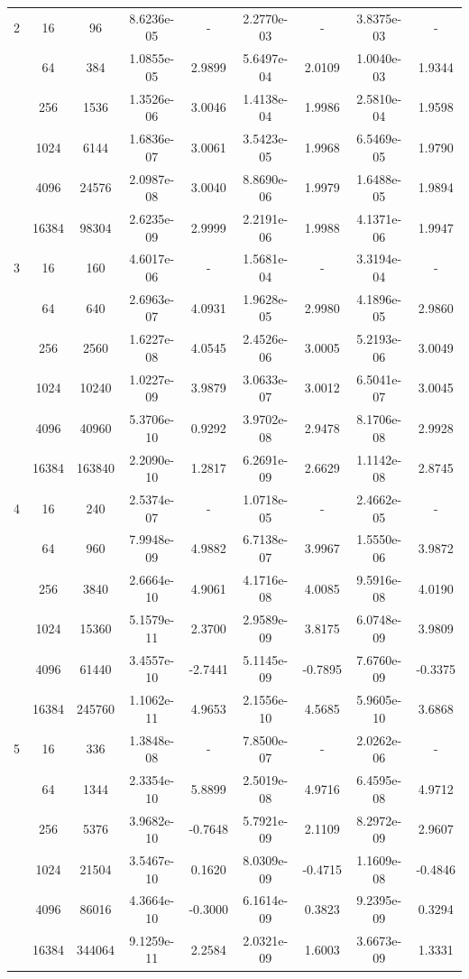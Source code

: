 \begin{longtable}{| c | c c | c c | c c | c c |}
	\hline

	2	& 16 & 96 & 8.6236e-05 & - & 2.2770e-03 & - & 3.8375e-03 & - \\
		& 64 & 384 & 1.0855e-05 & 2.9899 & 5.6497e-04 & 2.0109 & 1.0040e-03 & 1.9344 \\
		& 256 & 1536 & 1.3526e-06 & 3.0046 & 1.4138e-04 & 1.9986 & 2.5810e-04 & 1.9598 \\
		& 1024 & 6144 & 1.6836e-07 & 3.0061 & 3.5423e-05 & 1.9968 & 6.5469e-05 & 1.9790 \\
		& 4096 & 24576 & 2.0987e-08 & 3.0040 & 8.8690e-06 & 1.9979 & 1.6488e-05 & 1.9894 \\
		& 16384 & 98304 & 2.6235e-09 & 2.9999 & 2.2191e-06 & 1.9988 & 4.1371e-06 & 1.9947 \\

	\hline

	3	& 16 & 160 & 4.6017e-06 & - & 1.5681e-04 & - & 3.3194e-04 & - \\
		& 64 & 640 & 2.6963e-07 & 4.0931 & 1.9628e-05 & 2.9980 & 4.1896e-05 & 2.9860 \\
		& 256 & 2560 & 1.6227e-08 & 4.0545 & 2.4526e-06 & 3.0005 & 5.2193e-06 & 3.0049 \\
		& 1024 & 10240 & 1.0227e-09 & 3.9879 & 3.0633e-07 & 3.0012 & 6.5041e-07 & 3.0045 \\
		& 4096 & 40960 & 5.3706e-10 & 0.9292 & 3.9702e-08 & 2.9478 & 8.1706e-08 & 2.9928 \\
		& 16384 & 163840 & 2.2090e-10 & 1.2817 & 6.2691e-09 & 2.6629 & 1.1142e-08 & 2.8745 \\

	\hline

	4	& 16 & 240 & 2.5374e-07 & - & 1.0718e-05 & - & 2.4662e-05 & - \\
		& 64 & 960 & 7.9948e-09 & 4.9882 & 6.7138e-07 & 3.9967 & 1.5550e-06 & 3.9872 \\
		& 256 & 3840 & 2.6664e-10 & 4.9061 & 4.1716e-08 & 4.0085 & 9.5916e-08 & 4.0190 \\
		& 1024 & 15360 & 5.1579e-11 & 2.3700 & 2.9589e-09 & 3.8175 & 6.0748e-09 & 3.9809 \\
		& 4096 & 61440 & 3.4557e-10 & -2.7441 & 5.1145e-09 & -0.7895 & 7.6760e-09 & -0.3375 \\
		& 16384 & 245760 & 1.1062e-11 & 4.9653 & 2.1556e-10 & 4.5685 & 5.9605e-10 & 3.6868 \\

	\hline
    
	5	& 16 & 336 & 1.3848e-08 & - & 7.8500e-07 & - & 2.0262e-06 & - \\
		& 64 & 1344 & 2.3354e-10 & 5.8899 & 2.5019e-08 & 4.9716 & 6.4595e-08 & 4.9712 \\
		& 256 & 5376 & 3.9682e-10 & -0.7648 & 5.7921e-09 & 2.1109 & 8.2972e-09 & 2.9607 \\
		& 1024 & 21504 & 3.5467e-10 & 0.1620 & 8.0309e-09 & -0.4715 & 1.1609e-08 & -0.4846 \\	
		& 4096 & 86016 & 4.3664e-10 & -0.3000 & 6.1614e-09 & 0.3823 & 9.2395e-09 & 0.3294 \\
		& 16384 & 344064 & 9.1259e-11 & 2.2584 & 2.0321e-09 & 1.6003 & 3.6673e-09 & 1.3331 \\
	

\end{longtable}
